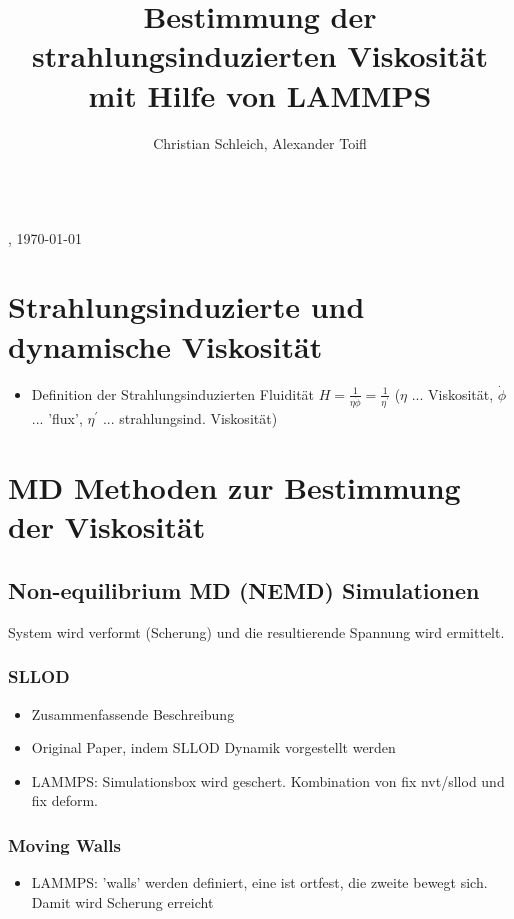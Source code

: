 \documentclass[a4paper, 10pt, 
               numbers=noenddot, toc=graduated,
               headsepline=true, footsepline=true,
               twoside=false, titlepage=true, 
               bibliography=totoc]{scrartcl}
\begin{document}
\title{Bestimmung der strahlungsinduzierten Viskosit{\"a}t mit Hilfe von LAMMPS}
\author{Christian Schleich, Alexander Toifl}

\begin{center}
\huge{\thetitle} \\
\small{\theauthor, \today}
\end{center}

\hspace{1 cm}


\section{Strahlungsinduzierte und dynamische Viskosität}
\begin{itemize}
	 \item Definition der Strahlungsinduzierten Fluidität $H = \frac 1 {\eta \dot{\phi}} = \frac 1 {\eta^{'}}$  ($\eta$ ... Viskosität, $\dot{\phi}$ ... 'flux', $\eta^{'}$ ... strahlungsind. Viskosität) \cite{Mayr2003}
\end{itemize}


\section{MD Methoden zur Bestimmung der Viskosität}

\subsection{Non-equilibrium MD (NEMD) Simulationen}

System wird verformt (Scherung) und die resultierende Spannung wird ermittelt. 


	\subsubsection{SLLOD}
		\begin{itemize}
		 	\item Zusammenfassende Beschreibung \cite{Tenney2010} 
		 	\item Original Paper, indem SLLOD Dynamik vorgestellt werden \cite{Evans1984}
		 	\item LAMMPS: Simulationsbox wird geschert. Kombination von fix nvt/sllod und fix deform.
		\end{itemize}
		
	\subsubsection{Moving Walls}
	    \begin{itemize}
		 	\item LAMMPS: 'walls' werden definiert, eine ist ortfest, die zweite bewegt sich. Damit wird Scherung erreicht
		\end{itemize}
\end{document}

